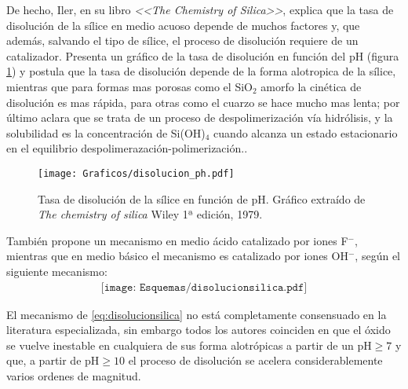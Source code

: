 	De hecho, Iler, en su libro \textit{<<The Chemistry of Silica>>}, explica que la tasa de disolución de la sílice en medio acuoso depende de muchos factores y, que además, salvando el tipo de sílice, el proceso de disolución requiere de un catalizador. Presenta un gráfico de la tasa de disolución en función del pH (figura \ref{fig:disolucion_ph}) y postula que la tasa de disolución depende de la forma alotropica de la sílice, mientras que para formas mas porosas como el SiO$_2$ amorfo la cinética de disolución es mas rápida, para otras como el cuarzo se hace mucho mas lenta; por último aclara que se trata de un proceso de despolimerización vía hidrólisis, y la solubilidad es la concentración de Si(OH)$_4$ cuando alcanza un estado estacionario en el equilibrio despolimerazación-polimerización.\cite{iler1979}. 

			\begin{figure}[th!]
			\centering
 	       	\texttt{[image: Graficos/disolucion\_ph.pdf]}
	       		\caption[Tasa de disolución sílice en función del pH]{Tasa de disolución de la sílice en función de pH. Gráfico extraído de \textit{The chemistry of silica} Wiley 1ª edición, 1979.\cite{iler1979}}
	         	\label{fig:disolucion_ph}
	     		\end{figure}
	
	También propone un mecanismo en medio ácido catalizado por iones F$^-$, mientras que en medio básico el mecanismo es catalizado por iones OH$^-$, según el siguiente mecanismo:
			\begin{equation}
				\begin{aligned}
				\texttt{[image: Esquemas/disolucionsilica.pdf]}
				\label{eq:disolucionsilica}
				\end{aligned}
				\end{equation} 
	
	El mecanismo de \ref{eq:disolucionsilica} no está completamente consensuado en la literatura especializada, sin embargo todos los autores coinciden en que el óxido se vuelve inestable en cualquiera de sus forma alotrópicas a partir de un $\text{pH}\geq7$ y que, a partir de $\text{pH}\geq10$ el proceso de disolución se acelera considerablemente varios ordenes de magnitud.\cite{Kosmulski2002,Kosmulski2014,Schwarz1984,Si-HanWu2013,iler1979}

